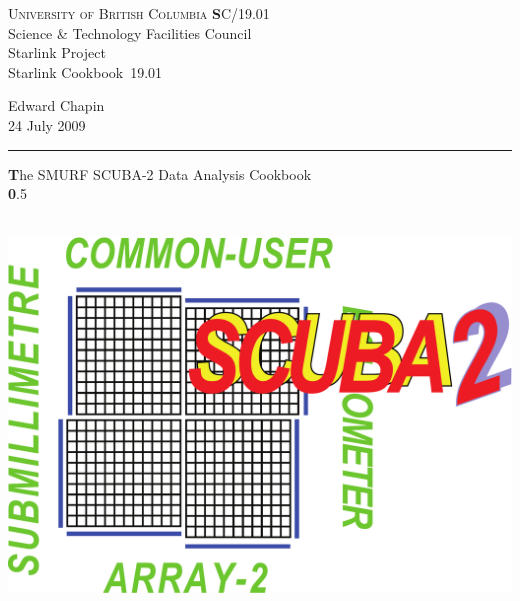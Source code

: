 \documentclass[twoside,11pt]{article}
\newcommand{\stardoccategory}  {Starlink Cookbook}
\newcommand{\stardocinitials}  {SC}
\newcommand{\stardocnumber}    {19.01}
\newcommand{\stardocauthors}   {Edward Chapin}
\newcommand{\stardocdate}      {24 July 2009}
\newcommand{\stardoctitle}     {The SMURF SCUBA-2 Data Analysis Cookbook}
\newcommand{\stardocversion}   {0.5}
\newcommand{\stardocmanual}    {\ }
\newcommand{\stardocname}{\stardocinitials /\stardocnumber}
\newenvironment{latexonly}{}{}
\renewcommand{\_}{\texttt{\symbol{95}}}
\begin{document}
\thispagestyle{empty}

\begin{latexonly}
   \textsc{University of British Columbia} \hfill {\textbf 
\stardocname}\\
   {\large  Science \& Technology Facilities Council}\\
   {\large Starlink Project\\}
   {\large \stardoccategory\ \stardocnumber}
   \begin{flushright}
   \stardocauthors\\
   \stardocdate
   \end{flushright}
   \vspace{-4mm}
   \rule{\textwidth}{0.5mm}
   \vspace{5mm}
   \begin{center}
   {\Huge\textbf  \stardoctitle \\ [2.5ex]}
   {\LARGE\textbf \stardocversion \\ [4ex]}
   {\Huge\textbf  \stardocmanual}
   \end{center}

\begin{center}
\hspace{1.3in}\includegraphics[scale=0.3]{sc19_logo}
\end{center}

\end{latexonly}
\end{document}
